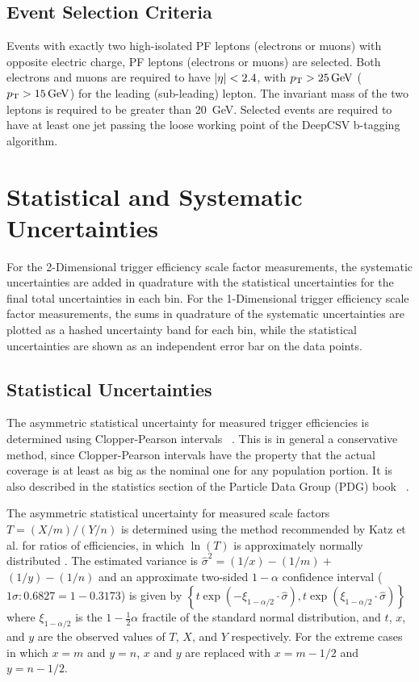 {\subsection{Event Selection Criteria}
Events with exactly two high-\pT isolated PF leptons (electrons or muons) with opposite electric charge, PF leptons (electrons or muons) are selected. 
Both electrons and muons are required to have $\left\vert\eta\right\vert < 2.4$, with $\pT > \SI{25}{\GeV}$ ($\pT > \SI{15}{\GeV}$) for the leading (sub-leading) lepton.  
The invariant mass of the two leptons is required to be greater than \SI{20}{\GeV}.  
Selected events are required to have at least one jet passing the loose working point of the DeepCSV b-tagging algorithm.

\section{Statistical and Systematic Uncertainties}
For the 2-Dimensional trigger efficiency scale factor measurements, the systematic uncertainties are added in quadrature with the statistical uncertainties for the final total uncertainties in each bin. 
For the 1-Dimensional trigger efficiency scale factor measurements, the sums in quadrature of the systematic uncertainties are plotted as a hashed uncertainty band for each bin, while the statistical uncertainties are shown as an independent error bar on the data points.
\subsection{Statistical Uncertainties}
The asymmetric statistical uncertainty for measured trigger efficiencies is determined using Clopper-Pearson intervals ~\cite{bib:Cousins:2009kz}.
This is in general a conservative method, since Clopper-Pearson intervals have the property that the actual coverage is at least as big as the nominal one for any population portion. 
It is also described in the statistics section of the Particle Data Group (PDG) book ~\cite{bib:PDG}.

The asymmetric statistical uncertainty for measured scale factors $T=(X / m) /(Y / n)$ is determined using the method recommended by Katz et al. for ratios of efficiencies, in which $\ln (T)$ is approximately normally distributed \cite{bib:10.2307/2531405}. 
The estimated variance is  $\hat{\sigma}^{2}=(1 / x)-(1 / m)+$ $(1 / y)-(1 / n)$ and an approximate two-sided $1 - \alpha$ confidence interval ($1 \sigma: 0.6827 = 1 - 0.3173$) is given by $\left\{t \exp \left(-\xi_{1-\alpha / 2} \cdot \hat{\sigma}\right), t \exp \left(\xi_{1-\alpha / 2} \cdot \hat{\sigma}\right)\right\}$ where $\xi_{1-\alpha / 2}$ is the $1-\frac{1}{2} \alpha$ fractile of the standard normal distribution, and $t$, $x$, and $y$ are the observed values of $T$, $X$, and $Y$ respectively.  
For the extreme cases in which $x = m$ and $y = n$, $x$ and $y$ are replaced with $x = m - 1/2$ and $y = n - 1/2$.
}
